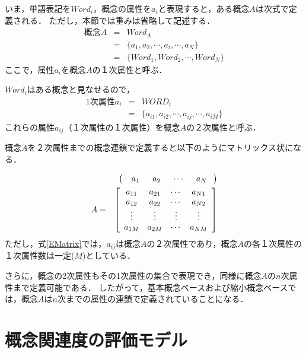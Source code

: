 いま，単語表記を$Word_i$，概念の属性を$a_i$と表現すると，ある概念$A$は次式で定義される．
ただし，本節では重みは省略して記述する．
\begin{eqnarray}
\mbox{概念}A &=& Word_A \\
             &=& \{ a_1, a_2, \cdots, a_i, \cdots, a_N \} \\
             &=& \{ Word_1, Word_2, \cdots, Word_N \}
\end{eqnarray}
ここで，属性$a_i$を概念$A$の１次属性と呼ぶ．

$Word_i$はある概念と見なせるので，
\begin{eqnarray}
\mbox{1次属性}a_i &=& WORD_i \\
                  &=& \{ a_{i1}, a_{i2}, \cdots, a_{ij}, \cdots, a_{iM} \}
\end{eqnarray}
これらの属性$a_{ij}$（１次属性の１次属性）を概念$A$の２次属性と呼ぶ．

概念$A$を２次属性までの概念連鎖で定義すると以下のようにマトリックス状になる．

{\samepage
\begin{eqnarray}
  & & \left( \begin{array}{cccc}
         \hspace{0.2cm} a_1 \hspace{0.2cm}& a_2 \hspace{0.2cm}& \cdots \hspace{0.2cm}& a_{N} \hspace{0.1cm}
      \end{array} \right)	\nonumber \\
A &=& 
	\left[ \begin{array}{cccc}
		a_{11} & a_{21} & \cdots & a_{N1} \\
		a_{12} & a_{22} & \cdots & a_{N2} \\
		\vdots & \vdots & \vdots & \vdots \\
		a_{1M} & a_{2M} & \cdots & a_{NM} 
	\end{array} \right] 	\label{EMatrix}
\end{eqnarray}
}
ただし，式\ref{EMatrix}では，$a_{ij}$は概念$A$の２次属性であり，概念$A$の各１次属性の１次属性数は一定($M$)としている．

さらに，概念の2次属性もその1次属性の集合で表現でき，同様に概念$A$の$n$次属性まで定義可能である．
したがって，基本概念ベースおよび縮小概念ベースでは，概念$A$は$n$次までの属性の連鎖で定義されていることになる．

\section{概念関連度の評価モデル}


